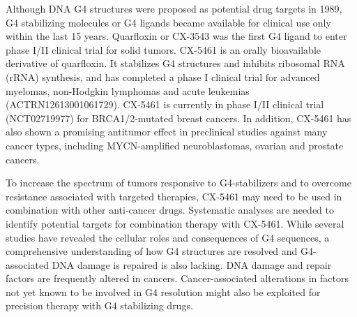 Although DNA G4 structures were proposed as potential drug targets in 1989\cite{Hurley1989a}, G4 stabilizing molecules or G4 ligands became available for clinical use only within the last 15 years. Quarfloxin or CX-3543 was the first G4 ligand to enter phase I/II clinical trial for solid tumors\cite{Drygin2009}. CX-5461 is an orally bioavailable derivative of quarfloxin. It stabilizes G4 structures and inhibits ribosomal RNA (rRNA) synthesis, and has completed a phase I clinical trial for advanced myelomas, non-Hodgkin lymphomas and acute leukemias (ACTRN12613001061729)\cite{Drygin2011,Haddach2012,Bywater2012,Khot2017,Xu2017}. CX-5461 is currently in phase I/II clinical trial (NCT02719977) for BRCA1/2-mutated breast cancers\cite{Xu2017}. In addition, CX-5461 has also shown a promising antitumor effect in preclinical studies against many cancer types, including MYCN-amplified neuroblastomas, ovarian and prostate cancers\cite{Negi2015a,Lee2017,Hein2017,Hald2018,Cornelison2017,Rebello2016}. 

To increase the spectrum of tumors responsive to G4-stabilizers and to overcome resistance associated with targeted therapies, CX-5461 may need to be used in combination with other anti-cancer drugs. Systematic analyses are needed to identify potential targets for combination therapy with CX-5461. While several studies have revealed the cellular roles and consequences of G4 sequences, a comprehensive understanding of how G4 structures are resolved and G4-associated DNA damage is repaired is also lacking. DNA damage and repair factors are frequently altered in cancers. Cancer-associated alterations in factors not yet known to be involved in G4 resolution might also be exploited for precision therapy with G4 stabilizing drugs. 

